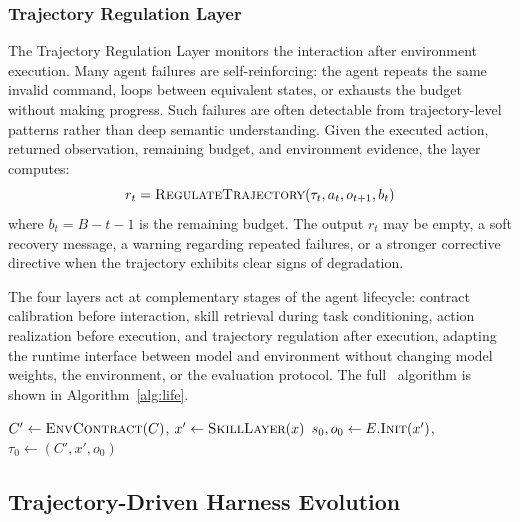 \subsubsection{Trajectory Regulation Layer}
\label{sec:h4}

The Trajectory Regulation Layer monitors the interaction after environment
execution. Many agent failures are self-reinforcing: the agent repeats the same invalid command, loops between equivalent states, or exhausts the budget without making progress. Such failures are often detectable from trajectory-level patterns rather than deep semantic understanding.
Given the executed action, returned observation, remaining budget, and
environment evidence, the layer computes:
\[
    r_t =
    \textsc{RegulateTrajectory}(\tau_t,a_t,o_{t+1},b_t)
\]
where \(b_t=B-t-1\) is the remaining budget. The output \(r_t\) may be empty, a soft recovery message, a warning regarding repeated failures, or a stronger corrective directive when the trajectory exhibits clear signs of degradation.

The four layers act at complementary stages of the agent lifecycle: contract calibration before interaction, skill retrieval during task conditioning, action realization before execution, and trajectory regulation after execution, adapting the runtime interface between model and environment without changing model weights, the environment, or the evaluation protocol. The full \method~algorithm is shown in Algorithm~\ref{alg:life}.

\begin{algorithm}[t]
    \caption{\method{} loop}
    \label{alg:life}
    \small
    \(C' \leftarrow \textsc{EnvContract}(C)\), 
    \(x' \leftarrow \textsc{SkillLayer}(x)\)\;
    \(s_0,o_0 \leftarrow E.\textsc{Init}(x')\), 
    \(\tau_0 \leftarrow (C',x',o_0)\)\;
\end{algorithm}

\subsection{Trajectory-Driven Harness Evolution}
\label{sec:harness-construction}

